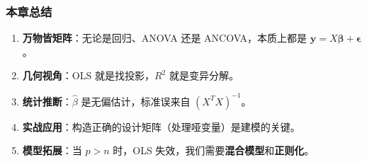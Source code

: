 
\begin{frame}
\frametitle{本章总结}

\begin{enumerate}
    \item \textbf{万物皆矩阵}：无论是回归、ANOVA 还是 ANCOVA，本质上都是 $\mathbf{y} = X\boldsymbol{\beta} + \boldsymbol{\epsilon}$。
    \item \textbf{几何视角}：OLS 就是找投影，$R^2$ 就是变异分解。
    \item \textbf{统计推断}：$\hat{\beta}$ 是无偏估计，标准误来自 $(X^T X)^{-1}$。
    \item \textbf{实战应用}：构造正确的设计矩阵（处理哑变量）是建模的关键。
    \item \textbf{模型拓展}：当 $p > n$ 时，OLS 失效，我们需要\textbf{混合模型}和\textbf{正则化}。
\end{enumerate}

\end{frame}



